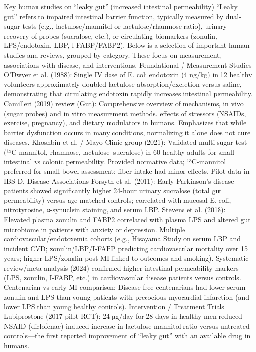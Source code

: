 Key human studies on “leaky gut” (increased intestinal permeability)
“Leaky gut” refers to impaired intestinal barrier function, typically measured by dual-sugar tests (e.g., lactulose/mannitol or lactulose/rhamnose ratio), urinary recovery of probes (sucralose, etc.), or circulating biomarkers (zonulin, LPS/endotoxin, LBP, I-FABP/FABP2). Below is a selection of important human studies and reviews, grouped by category. These focus on measurement, associations with disease, and interventions.
Foundational / Measurement Studies
O’Dwyer et al. (1988): Single IV dose of E. coli endotoxin (4 ng/kg) in 12 healthy volunteers approximately doubled lactulose absorption/excretion versus saline, demonstrating that circulating endotoxin rapidly increases intestinal permeability.
Camilleri (2019) review (Gut): Comprehensive overview of mechanisms, in vivo (sugar probes) and in vitro measurement methods, effects of stressors (NSAIDs, exercise, pregnancy), and dietary modulators in humans. Emphasizes that while barrier dysfunction occurs in many conditions, normalizing it alone does not cure diseases.
Khoshbin et al. / Mayo Clinic group (2021): Validated multi-sugar test (¹³C-mannitol, rhamnose, lactulose, sucralose) in 60 healthy adults for small-intestinal vs colonic permeability. Provided normative data; ¹³C-mannitol preferred for small-bowel assessment; fiber intake had minor effects. Pilot data in IBS-D.
Disease Associations
Forsyth et al. (2011): Early Parkinson’s disease patients showed significantly higher 24-hour urinary sucralose (total gut permeability) versus age-matched controls; correlated with mucosal E. coli, nitrotyrosine, α-synuclein staining, and serum LBP.
Stevens et al. (2018): Elevated plasma zonulin and FABP2 correlated with plasma LPS and altered gut microbiome in patients with anxiety or depression.
Multiple cardiovascular/endotoxemia cohorts (e.g., Hisayama Study on serum LBP and incident CVD; zonulin/LBP/I-FABP predicting cardiovascular mortality over 15 years; higher LPS/zonulin post-MI linked to outcomes and smoking). Systematic review/meta-analysis (2024) confirmed higher intestinal permeability markers (LPS, zonulin, I-FABP, etc.) in cardiovascular disease patients versus controls.
Centenarian vs early MI comparison: Disease-free centenarians had lower serum zonulin and LPS than young patients with precocious myocardial infarction (and lower LPS than young healthy controls).
Intervention / Treatment Trials
Lubiprostone (2017 pilot RCT): 24 µg/day for 28 days in healthy men reduced NSAID (diclofenac)-induced increase in lactulose-mannitol ratio versus untreated controls—the first reported improvement of “leaky gut” with an available drug in humans.
